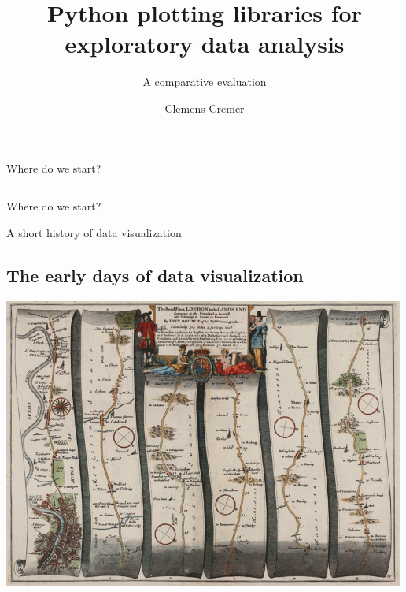 \documentclass[
  letterpaper,
  DIV=11,
  numbers=noendperiod]{scrartcl}
\title{Python plotting libraries for exploratory data analysis}
\subtitle{A comparative evaluation}
\author{Clemens Cremer}
\date{}
\begin{document}
\maketitle
\ifdefined\Shaded\renewenvironment{Shaded}{\begin{tcolorbox}[borderline west={3pt}{0pt}{shadecolor}, sharp corners, interior hidden, enhanced, boxrule=0pt, breakable, frame hidden]}{\end{tcolorbox}}\fi

\hypertarget{section}{%
\subsection{}\label{section}}

Where do we start?

\hypertarget{section-1}{%
\subsection{}\label{section-1}}

Where do we start?

A short history of data visualization

\hypertarget{the-early-days-of-data-visualization}{%
\subsection{The early days of data
visualization}\label{the-early-days-of-data-visualization}}

\includegraphics[width=5.20833in,height=\textheight]{images/1675-Ogilby-The_Road_From_LONDON_to_the_LANDS_END.png}
\end{document}
